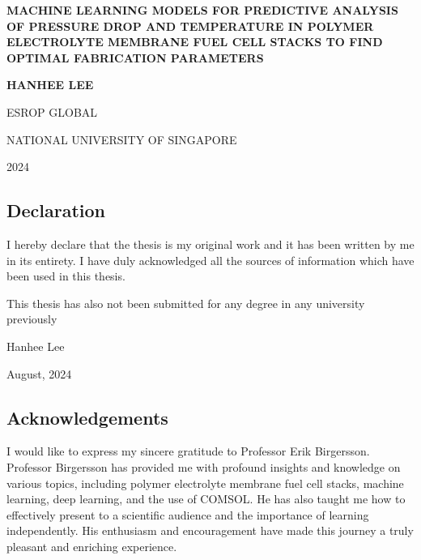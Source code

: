 \documentclass{report}
\begin{document}
\begin{titlepage}
    \centering

    {\Large \textbf{MACHINE LEARNING MODELS FOR PREDICTIVE ANALYSIS OF PRESSURE DROP AND TEMPERATURE IN POLYMER ELECTROLYTE MEMBRANE FUEL CELL STACKS TO FIND OPTIMAL FABRICATION PARAMETERS}}
    
    \vspace{5em}
    
    {\Large \textbf{HANHEE LEE}}
    
    \vfill
    
    {\Large ESROP GLOBAL}
    
    \vspace{1em} {\Large NATIONAL UNIVERSITY OF SINGAPORE}
    
    \vspace{1em} {\Large 2024}
    
\end{titlepage}


\begin{center}
    \section*{Declaration}
    I hereby declare that the thesis is my original work and it has been written by 
    me in its entirety. I have duly acknowledged all the sources of information 
    which have been used in this thesis. 
    
    \vspace{1em} \noindent This thesis has also not been submitted for any degree in any university previously 
    
    \vspace{1em} \noindent Hanhee Lee
    
    \vspace{1em} \noindent August, 2024
\end{center} 

\begin{center}
    \newpage \section*{Acknowledgements}
\end{center}
    \noindent I would like to express my sincere gratitude to Professor Erik Birgersson. Professor Birgersson has provided me with profound insights and knowledge on various topics, including polymer electrolyte membrane fuel cell stacks, machine learning, deep learning, and the use of COMSOL. He has also taught me how to effectively present to a scientific audience and the importance of learning independently. His enthusiasm and encouragement have made this journey a truly pleasant and enriching experience.
\end{document}
